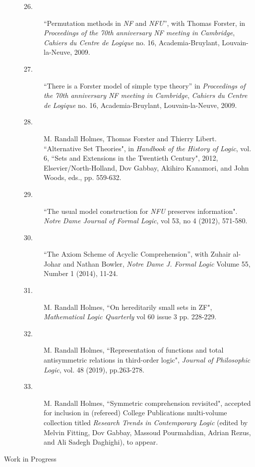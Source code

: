 \begin{description}
\begin{description}
\item[26.] ``Permutation methods in {\em NF\/} and {\em NFU\/}'', with
Thomas Forster, in {\em Proceedings of the 70th anniversary NF meeting
in Cambridge\/}, {\em Cahiers du Centre de Logique\/} no. 16,
Academia-Bruylant, Louvain-la-Neuve, 2009.

\item[27.] ``There is a Forster model of simple type theory'' in {\em
Proceedings of the 70th anniversary NF meeting in Cambridge\/}, {\em
Cahiers du Centre de Logique\/} no. 16, Academia-Bruylant,
Louvain-la-Neuve, 2009.

\item[28.]
M. Randall Holmes, Thomas Forster and Thierry Libert. ``Alternative Set Theories",  in {\em Handbook of the History of Logic\/}, vol. 6, ``Sets and Extensions in the Twentieth Century", 2012, Elsevier/North-Holland, Dov Gabbay, Akihiro Kanamori, and John Woods, eds., pp. 559-632.

\item[29.] ``The usual model construction for {\em NFU\/} preserves information".  {\em Notre Dame Journal of Formal Logic\/}, vol 53, no 4 (2012), 571-580.

\item[30.]  ``The Axiom Scheme of Acyclic Comprehension'', with Zuhair al-Johar and Nathan Bowler, {\em Notre Dame J. Formal Logic\/}
Volume 55, Number 1 (2014), 11-24.

\item[31.]  M. Randall Holmes, ``On hereditarily small sets in ZF", {\em Mathematical Logic Quarterly\/}  vol 60 issue 3 pp. 228-229.

\item[32.]  M. Randall Holmes, ``Representation of functions and total antisymmetric relations in third-order logic", {\em Journal of Philosophic Logic\/}, vol. 48 (2019), pp.263-278.

\item[33.] M. Randall Holmes, ``Symmetric comprehension revisited", accepted for inclusion in (refereed) College Publications multi-volume collection titled {\em Research Trends in Contemporary Logic\/} (edited by Melvin Fitting, Dov Gabbay, Massoud Pourmahdian, Adrian Rezus, and Ali Sadegh Daghighi), to appear.


        \end{description}

\newpage

\item[Work in Progress]
\begin{enumerate}


\end{enumerate}
\end{description}
